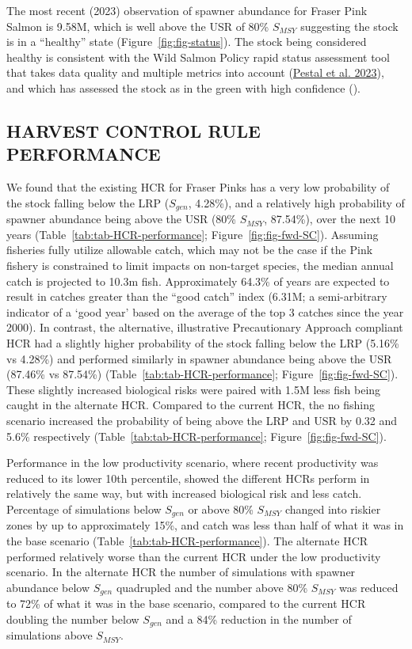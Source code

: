 \documentclass[11pt]{book}
\begin{document}
The most recent (2023) observation of spawner abundance for Fraser Pink Salmon is 9.58M, which is well above the USR of 80\% \(S_{MSY}\) suggesting the stock is in a ``healthy'' state (Figure~\ref{fig:fig-status}). The stock being considered healthy is consistent with the Wild Salmon Policy rapid status assessment tool that takes data quality and multiple metrics into account (\protect\hyperlink{ref-pestalStateSalmonRapid2023}{Pestal et al. 2023}), and which has assessed the stock as in the green with high confidence ().

\hypertarget{harvest-control-rule-performance}{%
\subsection{HARVEST CONTROL RULE PERFORMANCE}\label{harvest-control-rule-performance}}

We found that the existing HCR for Fraser Pinks has a very low probability of the stock falling below the LRP (\(S_{gen}\), 4.28\%), and a relatively high probability of spawner abundance being above the USR (80\% \(S_{MSY}\), 87.54\%), over the next 10 years (Table~\ref{tab:tab-HCR-performance}; Figure~\ref{fig:fig-fwd-SC}). Assuming fisheries fully utilize allowable catch, which may not be the case if the Pink fishery is constrained to limit impacts on non-target species, the median annual catch is projected to 10.3m fish. Approximately 64.3\% of years are expected to result in catches greater than the ``good catch'' index (6.31M; a semi-arbitrary indicator of a `good year' based on the average of the top 3 catches since the year 2000). In contrast, the alternative, illustrative Precautionary Approach compliant HCR had a slightly higher probability of the stock falling below the LRP (5.16\% vs 4.28\%) and performed similarly in spawner abundance being above the USR (87.46\% vs 87.54\%) (Table~\ref{tab:tab-HCR-performance}; Figure~\ref{fig:fig-fwd-SC}). These slightly increased biological risks were paired with 1.5M less fish being caught in the alternate HCR. Compared to the current HCR, the no fishing scenario increased the probability of being above the LRP and USR by 0.32 and 5.6\% respectively (Table~\ref{tab:tab-HCR-performance}; Figure~\ref{fig:fig-fwd-SC}).

Performance in the low productivity scenario, where recent productivity was reduced to its lower 10th percentile, showed the different HCRs perform in relatively the same way, but with increased biological risk and less catch. Percentage of simulations below \(S_{gen}\) or above 80\% \(S_{MSY}\) changed into riskier zones by up to approximately 15\%, and catch was less than half of what it was in the base scenario (Table~\ref{tab:tab-HCR-performance}). The alternate HCR performed relatively worse than the current HCR under the low productivity scenario. In the alternate HCR the number of simulations with spawner abundance below \(S_{gen}\) quadrupled and the number above 80\% \(S_{MSY}\) was reduced to 72\% of what it was in the base scenario, compared to the current HCR doubling the number below \(S_{gen}\) and a 84\% reduction in the number of simulations above \(S_{MSY}\).
\end{document}
